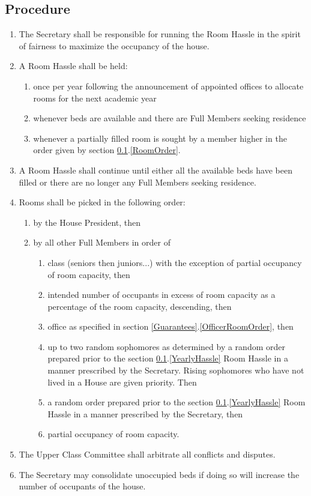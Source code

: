 \documentclass[10pt]{article} %
\begin{document}
\subsection{Procedure}
\label{RoomProcedure}
\begin{enumerate}
\item The Secretary shall be responsible for running the Room Hassle in the spirit of fairness to maximize the occupancy of the house.
\item A Room Hassle shall be held:
\begin{enumerate}
\item \label{YearlyHassle}once per year following the announcement of appointed offices to allocate rooms for the next academic year
\item \label{FreeBedHassle}whenever beds are available and there are Full Members seeking residence
\item \label{PartialHassle}whenever a partially filled room is sought by a member higher in the order given by section \ref{RoomProcedure}.\ref{RoomOrder}.
\end{enumerate}
\item A Room Hassle shall continue until either all the available beds have been filled or there are no longer any Full Members seeking residence.
\item \label{RoomOrder}Rooms shall be picked in the following order:
\begin{enumerate}
\item by the House President, then
\item by all other Full Members in order of
\begin{enumerate}
\item class (seniors then juniors...) with the exception of partial occupancy of room capacity, then
\item intended number of occupants in excess of room capacity as a percentage of the room capacity, descending, then
\item office as specified in section \ref{Guarantees}.\ref{OfficerRoomOrder}, then
\item up to two random sophomores as determined by a random order prepared prior to the section \ref{RoomProcedure}.\ref{YearlyHassle} Room Hassle in a manner prescribed by the Secretary. Rising sophomores who have not lived in a House are given priority. Then
\item a random order prepared prior to the section \ref{RoomProcedure}.\ref{YearlyHassle} Room Hassle in a manner prescribed by
the Secretary, then
\item partial occupancy of room capacity.
\end{enumerate}
\end{enumerate}
\item The Upper Class Committee shall arbitrate all conflicts and disputes.
\item \label{RoomConsolidation}The Secretary may consolidate unoccupied beds if doing so will increase the number of occupants of the house.
\end{enumerate}
\end{document}
